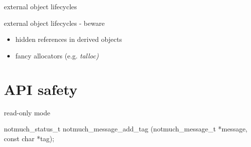 \documentclass[ignorenonframetext,aspectratio=169]{beamer}
\newenvironment{Shaded}{}{}
\newcommand{\KeywordTok}[1]{\textcolor[rgb]{0.00,0.44,0.13}{\textbf{{#1}}}}
\newcommand{\DataTypeTok}[1]{\textcolor[rgb]{0.56,0.13,0.00}{{#1}}}
\newcommand{\StringTok}[1]{\textcolor[rgb]{0.25,0.44,0.63}{{#1}}}
\newcommand{\OtherTok}[1]{\textcolor[rgb]{0.00,0.44,0.13}{{#1}}}
\newcommand{\FunctionTok}[1]{\textcolor[rgb]{0.02,0.16,0.49}{{#1}}}
\newcommand{\NormalTok}[1]{{#1}}
\providecommand{\tightlist}{%
  \setlength{\itemsep}{0pt}\setlength{\parskip}{0pt}}
\begin{document}
\begin{frame}[fragile]{external object lifecycles}

\begin{Shaded}
\end{Shaded}

\end{frame}

\begin{frame}{external object lifecycles - beware}
\begin{itemize}
\tightlist
\item
  hidden references in derived objects
\item
  fancy allocators (e.g. \em{talloc})
\end{itemize}
\end{frame}

\section{API safety}\label{api-safety}

\begin{frame}[fragile]{read-only mode}

\begin{Shaded}
\begin{Highlighting}[]
\NormalTok{notmuch_status_t}
\NormalTok{notmuch_message_add_tag (notmuch_message_t *message, }\DataTypeTok{const} \DataTypeTok{char} \NormalTok{*tag);}
\end{Highlighting}
\end{Shaded}

\end{frame}
\end{document}
